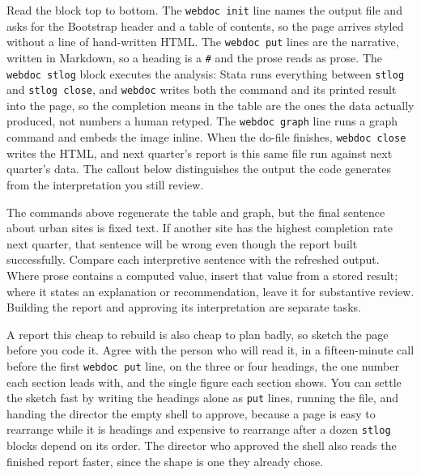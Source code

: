 Read the block top to bottom. The \texttt{webdoc init} line names the output file and asks for the Bootstrap header and a table of contents, so the page arrives styled without a line of hand-written HTML. The \texttt{webdoc put} lines are the narrative, written in Markdown, so a heading is a \texttt{\#} and the prose reads as prose. The \texttt{webdoc stlog} block executes the analysis: Stata runs everything between \texttt{stlog} and \texttt{stlog close}, and \texttt{webdoc} writes both the command and its printed result into the page, so the completion means in the table are the ones the data actually produced, not numbers a human retyped. The \texttt{webdoc graph} line runs a graph command and embeds the image inline. When the do-file finishes, \texttt{webdoc close} writes the HTML, and next quarter's report is this same file run against next quarter's data. The callout below distinguishes the output the code generates from the interpretation you still review.

\begin{vizcallout}
The commands above regenerate the table and graph, but the final sentence about urban sites is fixed text. If another site has the highest completion rate next quarter, that sentence will be wrong even though the report built successfully. Compare each interpretive sentence with the refreshed output. Where prose contains a computed value, insert that value from a stored result; where it states an explanation or recommendation, leave it for substantive review. Building the report and approving its interpretation are separate tasks.
\end{vizcallout}

A report this cheap to rebuild is also cheap to plan badly, so sketch the page before you code it. Agree with the person who will read it, in a fifteen-minute call before the first \texttt{webdoc put} line, on the three or four headings, the one number each section leads with, and the single figure each section shows. You can settle the sketch fast by writing the headings alone as \texttt{put} lines, running the file, and handing the director the empty shell to approve, because a page is easy to rearrange while it is headings and expensive to rearrange after a dozen \texttt{stlog} blocks depend on its order. The director who approved the shell also reads the finished report faster, since the shape is one they already chose.

